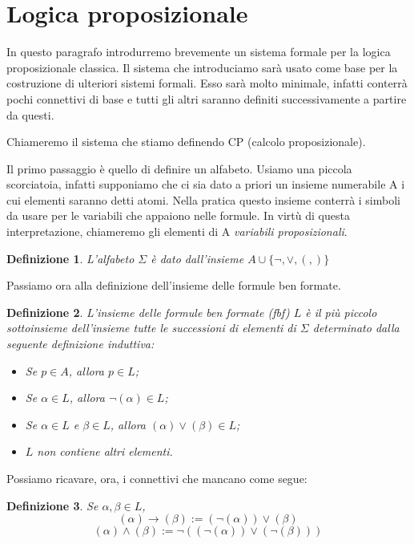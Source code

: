 \documentclass[a4paper, 12pt]{article}
\newtheorem{definition}{Definizione}
\begin{document}
\section{Logica proposizionale}
In questo paragrafo introdurremo brevemente un sistema formale per la logica proposizionale classica.
Il sistema che introduciamo sarà usato come base per la costruzione di ulteriori sistemi formali.
Esso sarà molto minimale, infatti conterrà pochi connettivi di base
e tutti gli altri saranno definiti successivamente a partire da questi.

Chiameremo il sistema che stiamo definendo CP (calcolo proposizionale).

Il primo passaggio è quello di definire un alfabeto. Usiamo una piccola scorciatoia,
infatti supponiamo che ci sia dato a priori un insieme numerabile A i cui elementi saranno detti atomi.
Nella pratica questo insieme conterrà i simboli da usare per le variabili che appaiono nelle formule.
In virtù di questa interpretazione, chiameremo gli elementi di A \textit{variabili proposizionali}.

\begin{definition}
L'alfabeto $\Sigma$ è dato dall'insieme $A \cup \{\neg, \vee, (, ) \}$
\end{definition}

Passiamo ora alla definizione dell'insieme delle formule ben formate.

\begin{definition}
L'insieme delle formule ben formate (fbf) $L$ è il più piccolo sottoinsieme dell'insieme tutte le successioni
di elementi di $\Sigma$ determinato dalla seguente definizione induttiva:
\begin{itemize}
\item Se $p \in A$, allora $p \in L$;
\item Se $\alpha \in L$, allora $\neg (\alpha) \in L$;
\item Se $\alpha \in L$ e $\beta \in L$, allora $(\alpha) \vee (\beta) \in L$;
\item $L$ non contiene altri elementi.
\end{itemize}
\end{definition}

Possiamo ricavare, ora, i connettivi che mancano come segue:
\begin{definition}
Se $\alpha, \beta \in L$,
$$(\alpha) \rightarrow (\beta) := (\neg (\alpha)) \vee (\beta)$$
$$(\alpha) \wedge (\beta) := \neg ((\neg (\alpha)) \vee (\neg (\beta)))$$
\end{definition}
\end{document}
